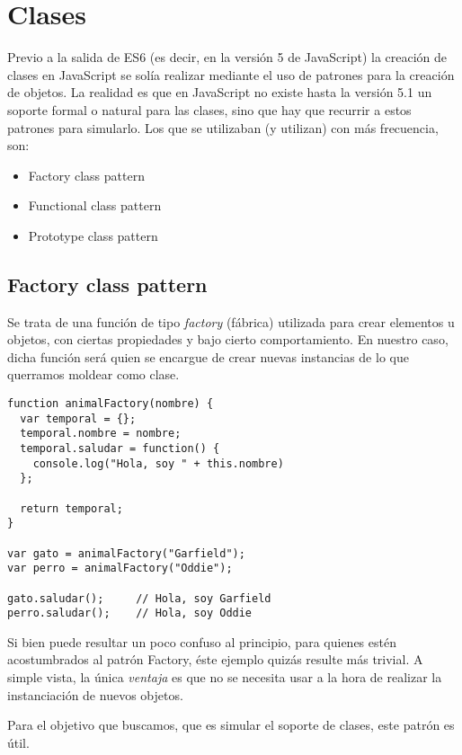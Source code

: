 \section{Clases}
\label{clases}

Previo a la salida de ES6 (es decir, en la versión 5 de JavaScript) la creación de clases en JavaScript se solía realizar mediante el uso de patrones para la creación de objetos. La realidad es que en JavaScript no existe hasta la versión 5.1 un soporte formal o natural para las clases, sino que hay que recurrir a estos patrones para simularlo. Los que se utilizaban (y utilizan) con más frecuencia, son:

\begin{itemize}
	\item Factory class pattern
	\item Functional class pattern
	\item Prototype class pattern
\end{itemize}

\subsection{Factory class pattern}

Se trata de una función de tipo \textit{factory} (fábrica) utilizada para crear elementos u objetos, con ciertas propiedades y bajo cierto comportamiento. En nuestro caso, dicha función será quien se encargue de crear nuevas instancias de lo que querramos moldear como clase.

\begin{lstlisting}[title={Factory class pattern}]
function animalFactory(nombre) {
  var temporal = {};
  temporal.nombre = nombre;
  temporal.saludar = function() {
    console.log("Hola, soy " + this.nombre)
  };

  return temporal;
}

var gato = animalFactory("Garfield");
var perro = animalFactory("Oddie");

gato.saludar();		// Hola, soy Garfield
perro.saludar();	// Hola, soy Oddie
\end{lstlisting}

Si bien puede resultar un poco confuso al principio, para quienes estén acostumbrados al patrón Factory, éste ejemplo quizás resulte más trivial. A simple vista, la única \textit{ventaja} es que no se necesita usar  a la hora de realizar la instanciación de nuevos objetos. 

Para el objetivo que buscamos, que es simular el soporte de clases, este patrón es útil.

